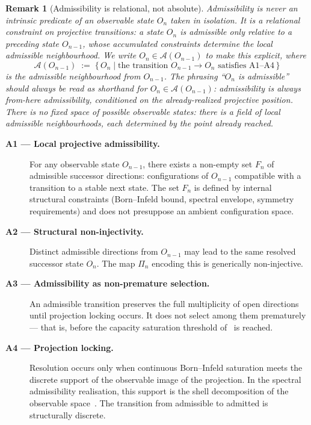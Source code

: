 \documentclass[11pt,a4paper]{article}
\newtheorem{remark}[theorem]{Remark}
\begin{document}
  \begin{remark}[Admissibility is relational, not absolute]
    \label{rem:admissibility-relational}
    Admissibility is never an intrinsic predicate of an observable state $O_n$ taken in
    isolation.
    It is a relational constraint on projective transitions: a state $O_n$ is admissible
    only relative to a preceding state $O_{n-1}$, whose accumulated constraints determine
    the local admissible neighbourhood.
    We write $O_n \in \mathcal{A}(O_{n-1})$ to make this explicit, where
    \begin{equation}
      \label{eq:admissible-neighbourhood}
      \mathcal{A}(O_{n-1}) \;:=\;
      \bigl\{\, O_n \mid \text{the transition } O_{n-1} \to O_n \text{ satisfies A1--A4} \,\bigr\}
    \end{equation}
    is the \emph{admissible neighbourhood from $O_{n-1}$}.
    The phrasing ``$O_n$ is admissible'' should always be read as shorthand for
    $O_n \in \mathcal{A}(O_{n-1})$: admissibility is always \emph{from-here} admissibility,
    conditioned on the already-realized projective position.
    There is no fixed space of possible observable states: there is a field of local
    admissible neighbourhoods, each determined by the point already reached.
  \end{remark}

  \begin{description}
    \item[\textbf{A1 — Local projective admissibility.}]
    For any observable state $O_{n-1}$, there exists a non-empty set $F_n$ of
    admissible successor directions: configurations of $O_{n-1}$ compatible with
    a transition to a stable next state.
    The set $F_n$ is defined by internal structural constraints
    (Born--Infeld bound, spectral envelope, symmetry requirements)
    and does not presuppose an ambient configuration space.

    \item[\textbf{A2 — Structural non-injectivity.}]
    Distinct admissible directions from $O_{n-1}$ may lead to the same resolved
    successor state $O_n$.
    The map $\Pi_n$ encoding this is generically non-injective.

    \item[\textbf{A3 — Admissibility as non-premature selection.}]
    An admissible transition preserves the full multiplicity of open directions
    until projection locking occurs.
    It does not select among them prematurely — that is, before the
    capacity saturation threshold of~\cite{Beau2026c} is reached.

    \item[\textbf{A4 — Projection locking.}]
    Resolution occurs only when continuous Born--Infeld saturation meets the
    discrete support of the observable image of the projection.
    In the spectral admissibility realisation, this support is the shell
    decomposition of the observable space~\cite{Beau2026a26}.
    The transition from admissible to admitted is structurally discrete.
  \end{description}
\end{document}
